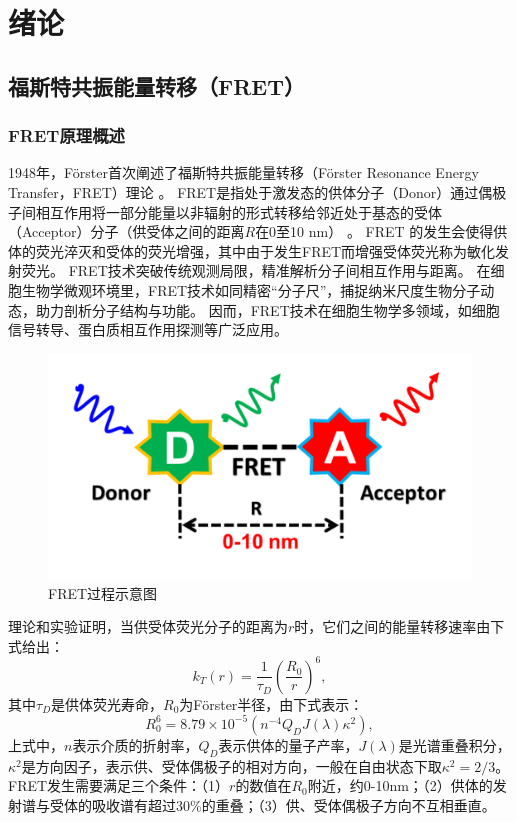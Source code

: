 \chapter{绪论}

\section{福斯特共振能量转移（FRET）}

\subsection{FRET原理概述}

\ifshowtext
1948年，Förster首次阐述了福斯特共振能量转移（Förster Resonance Energy Transfer，FRET）理论 。
FRET是指处于激发态的供体分子（Donor）通过偶极子间相互作用将一部分能量以非辐射的形式转移给邻近处于基态的受体（Acceptor）分子（供受体之间的距离$R$在0至10 nm） 。
FRET 的发生会使得供体的荧光淬灭和受体的荧光增强，其中由于发生FRET而增强受体荧光称为敏化发射荧光。
FRET技术突破传统观测局限，精准解析分子间相互作用与距离。
在细胞生物学微观环境里，FRET技术如同精密“分子尺”，捕捉纳米尺度生物分子动态，助力剖析分子结构与功能。
因而，FRET技术在细胞生物学多领域，如细胞信号转导、蛋白质相互作用探测等广泛应用。
\begin{figure}[htbp]
    \centering
    \includegraphics[width=0.5\linewidth]{../figures/1/1_FRET过程示意图.png}
    \caption{FRET过程示意图}
    \label{fig:fret}
\end{figure}

理论和实验证明，当供受体荧光分子的距离为$r$时，它们之间的能量转移速率由下式给出：
\begin{equation}
    k_T(r)=\frac{1}{\tau_D}(\frac{R_0}{r})^6, \label{eq:1-1}
\end{equation}
其中$\tau_D$是供体荧光寿命，$R_0$为Förster半径，由下式表示：
\begin{equation}
    R_0^6=8.79\times{10^{-5}}(n^{-4}Q_DJ(\lambda)\kappa^2),
\end{equation}
上式中，$n$表示介质的折射率，$Q_D$表示供体的量子产率，$J(\lambda)$是光谱重叠积分，$\kappa^2$是方向因子，表示供、受体偶极子的相对方向，一般在自由状态下取$\kappa^2=2/3$。FRET发生需要满足三个条件：（1）$r$的数值在$R_0$附近，约0-10nm；（2）供体的发射谱与受体的吸收谱有超过30\%的重叠；（3）供、受体偶极子方向不互相垂直。

